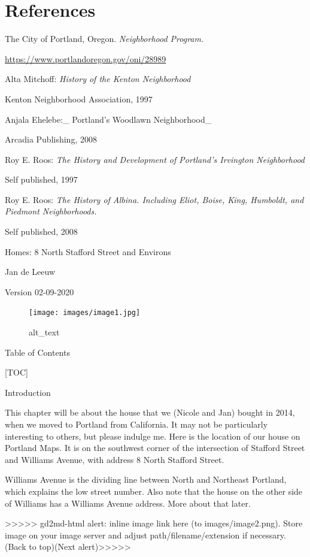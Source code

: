 \documentclass[
  12pt,
]{book}
\begin{document}
\hypertarget{references}{%
\chapter{References}\label{references}}

The City of Portland, Oregon. \emph{Neighborhood Program.}

\url{https://www.portlandoregon.gov/oni/28989}

Alta Mitchoff: \emph{History of the Kenton Neighborhood}

Kenton Neighborhood Association, 1997

Anjala Ehelebe:\_ Portland's Woodlawn Neighborhood\_

Arcadia Publishing, 2008

Roy E. Roos: \emph{The History and Development of Portland's Irvington Neighborhood}

Self published, 1997

Roy E. Roos: \emph{The History of Albina. Including Eliot, Boise, King, Humboldt, and Piedmont Neighborhoods.}

Self published, 2008

Homes: 8 North Stafford Street and Environs

Jan de Leeuw

Version 02-09-2020

\begin{figure}
\centering
\texttt{[image: images/image1.jpg]}
\caption{alt\_text}
\end{figure}

Table of Contents

{[}TOC{]}

Introduction

This chapter will be about the house that we (Nicole and Jan) bought in 2014, when we moved to Portland from California. It may not be particularly interesting to others, but please indulge me. Here is the location of our house on Portland Maps. It is on the southwest corner of the intersection of Stafford Street and Williams Avenue, with address 8 North Stafford Street.

Williams Avenue is the dividing line between North and Northeast Portland, which explains the low street number. Also note that the house on the other side of Williams has a Williams Avenue address. More about that later.

{\textgreater\textgreater\textgreater\textgreater\textgreater{} gd2md-html alert: inline image link here (to images/image2.png). Store image on your image server and adjust path/filename/extension if necessary. }(Back to top)(Next alert){\textgreater\textgreater\textgreater\textgreater\textgreater{} }
\end{document}
